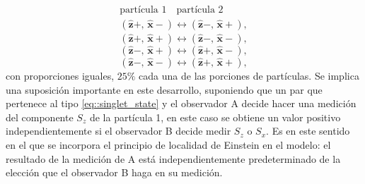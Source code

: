 \documentclass[a4paper]{article}
\begin{document}
\begin{equation*}
\begin{aligned}
\text{partícula 1}\,\,\,\,\,\,\text{partícula 2}\\
(\mathbf{\hat{z}}+,\, \mathbf{\hat{x}}-) \leftrightarrow (\mathbf{\hat{z}}-,\, \mathbf{\hat{x}}+), 
\end{aligned}
\end{equation*}
\begin{equation}\label{eq::type_1_singlet_state}
(\mathbf{\hat{z}}+,\, \mathbf{\hat{x}}+) \leftrightarrow (\mathbf{\hat{z}}-,\, \mathbf{\hat{x}}-),
\end{equation}
\begin{equation*}
(\mathbf{\hat{z}}-,\, \mathbf{\hat{x}}+) \leftrightarrow (\mathbf{\hat{z}}+,\, \mathbf{\hat{x}}-),
\end{equation*}
\begin{equation*}
(\mathbf{\hat{z}}-,\, \mathbf{\hat{x}}-) \leftrightarrow (\mathbf{\hat{z}}+,\, \mathbf{\hat{x}}+),
\end{equation*}
con proporciones iguales, $25\%$ cada una de las porciones de partículas. Se implica una suposición importante en este desarrollo, suponiendo que un par que pertenece al tipo \ref{eq::singlet_state} y el observador A decide hacer una medición del componente $S_z$ de la partícula 1, en este caso se obtiene un  valor positivo independientemente si el observador B decide medir $S_z$ o $S_x$. Es en este sentido en el que se incorpora el principio de localidad de Einstein en el modelo: el resultado de la medición de A está independientemente predeterminado de la elección que el observador B haga en su medición.\\
\end{document}
